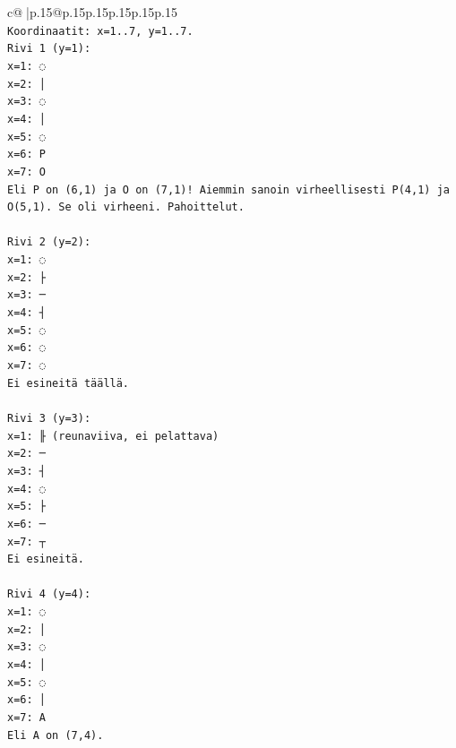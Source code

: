 \documentclass{article}
\begin{document}
{\begin{supertabular}{c@{$\;$}|p{.15\linewidth}@{}p{.15\linewidth}p{.15\linewidth}p{.15\linewidth}p{.15\linewidth}p{.15\linewidth}}
{{{\\ 
\texttt{Koordinaatit: x=1..7, y=1..7.} \\
\texttt{Rivi 1 (y=1): } \\
\texttt{x=1: ◌} \\
\texttt{x=2: │} \\
\texttt{x=3: ◌} \\
\texttt{x=4: │} \\
\texttt{x=5: ◌} \\
\texttt{x=6: P} \\
\texttt{x=7: O} \\
\texttt{Eli P on (6,1) ja O on (7,1)! Aiemmin sanoin virheellisesti P(4,1) ja O(5,1). Se oli virheeni. Pahoittelut.} \\
\\ 
\texttt{Rivi 2 (y=2):} \\
\texttt{x=1: ◌} \\
\texttt{x=2: ├} \\
\texttt{x=3: ─} \\
\texttt{x=4: ┤} \\
\texttt{x=5: ◌} \\
\texttt{x=6: ◌} \\
\texttt{x=7: ◌} \\
\texttt{Ei esineitä täällä.} \\
\\ 
\texttt{Rivi 3 (y=3):} \\
\texttt{x=1: ╟ (reunaviiva, ei pelattava)} \\
\texttt{x=2: ─} \\
\texttt{x=3: ┤} \\
\texttt{x=4: ◌} \\
\texttt{x=5: ├} \\
\texttt{x=6: ─} \\
\texttt{x=7: ┬} \\
\texttt{Ei esineitä.} \\
\\ 
\texttt{Rivi 4 (y=4):} \\
\texttt{x=1: ◌} \\
\texttt{x=2: │} \\
\texttt{x=3: ◌} \\
\texttt{x=4: │} \\
\texttt{x=5: ◌} \\
\texttt{x=6: │} \\
\texttt{x=7: A} \\
\texttt{Eli A on (7,4).} \\
\\ 
}}}
\end{supertabular}}
\end{document}
